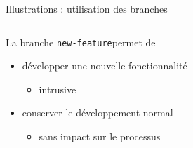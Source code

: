 \begin{frame}[fragile]{%
\protect\hypertarget{illustrations-utilisation-des-branches}{%
Illustrations : utilisation des branches}}
\begin{columns}[T]
\begin{column}{0.60\textwidth}
La branche \texttt{new-feature}permet de

\begin{itemize}
\tightlist
\item
  développer une nouvelle fonctionnalité

  \begin{itemize}
  \tightlist
  \item
    intrusive
  \end{itemize}
\item
  conserver le développement normal

  \begin{itemize}
  \tightlist
  \item
    sans impact sur le processus
  \end{itemize}
\end{itemize}
\end{column}
\end{columns}

\end{frame}

